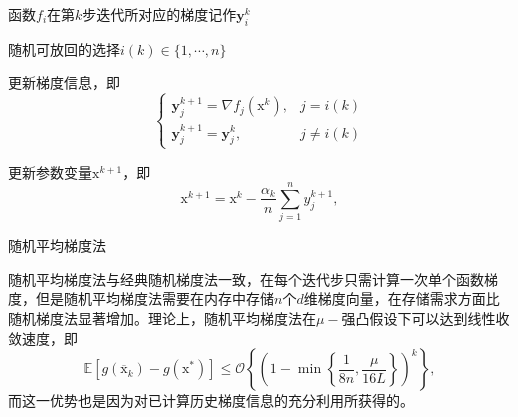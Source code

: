 \begin{algorithm}
    \SetAlgoLined
     {
        函数$f_{i}$在第$k$步迭代所对应的梯度记作$\bm{y}_{i}^{k}$

        随机可放回的选择$i(k) \in\{1, \cdots, n\}$
        
        更新梯度信息，即
            \begin{equation}
                \left\{\begin{array}{ll}
                \bm{y}_{j}^{k+1}=\nabla f_{j}\left(\mathrm{x}^{k}\right), & j=i(k) \\
                \bm{y}_{j}^{k+1}=\bm{y}_{j}^{k}, & j \neq i(k)
                \end{array}\right.
                \nonumber
            \end{equation}
            
        更新参数变量$\mathrm{x}^{k+1}$，即
            \begin{equation}
                \mathrm{x}^{k+1}=\mathrm{x}^{k}-\frac{\alpha_{k}}{n} \sum_{j=1}^{n} y_{j}^{k+1} ,
                \nonumber
            \end{equation}
    }
    \caption{随机平均梯度法}
    \label{alg6_1}
\end{algorithm}

\par 随机平均梯度法与经典随机梯度法一致，在每个迭代步只需计算一次单个函数梯度，但是随机平均梯度法需要在内存中存储$n$个$d$维梯度向量，在存储需求方面比随机梯度法显著增加。理论上，随机平均梯度法在$\mu-$强凸假设下可以达到线性收敛速度，即
\begin{equation}
    \mathbb{E}\left[g\left(\overline{\mathrm{x}}_{k}\right)-g\left(\mathrm{x}^{*}\right)\right] \leq \mathcal{O}\left\{\left(1-\min \left\{\frac{1}{8 n}, \frac{\mu}{16 L}\right\}\right)^{k}\right\} ,
    \nonumber
\end{equation}
而这一优势也是因为对已计算历史梯度信息的充分利用所获得的\cite{SAG}。

